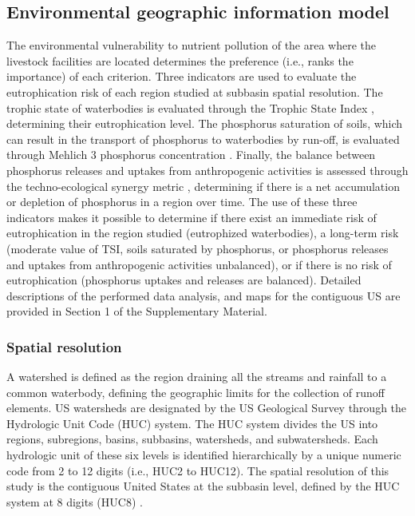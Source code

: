 \begin{refsection}[referencesCh4]
\subsection{Environmental geographic information model}
The environmental vulnerability to nutrient pollution of the area where the livestock facilities are located determines the preference (i.e., ranks the importance) of each criterion. 
Three indicators are used to evaluate the eutrophication risk of each region studied at subbasin spatial resolution. The trophic state of waterbodies is evaluated through the Trophic State Index \citep{carlson_trophic_1977}, determining their eutrophication level. The phosphorus saturation of soils, which can result in the transport of phosphorus to waterbodies by run-off, is evaluated through Mehlich 3 phosphorus concentration \citep{Espinoza2006}. Finally, the balance between phosphorus releases and uptakes from  anthropogenic activities is assessed through the techno-ecological synergy metric \citep{TESmetric}, determining if there is a net accumulation or depletion of phosphorus in a region over time. The use of these three indicators makes it possible to determine if there exist an immediate risk of eutrophication in the region studied (eutrophized waterbodies), a long-term risk (moderate value of TSI, soils saturated by phosphorus, or phosphorus releases and uptakes from  anthropogenic activities unbalanced), or if there is no risk of eutrophication (phosphorus uptakes and releases are balanced). Detailed descriptions of the performed data analysis, and maps for the contiguous US are provided in Section 1 of the Supplementary Material.

\subsubsection{Spatial resolution}
A watershed is defined as the region draining all the streams and rainfall to a common waterbody, defining the geographic limits for the collection of runoff elements. US watersheds are designated by the US Geological Survey through the Hydrologic Unit Code (HUC) system. The HUC system divides the US into regions, subregions, basins, subbasins, watersheds, and subwatersheds. Each hydrologic unit of these six levels is identified hierarchically by a unique numeric code from 2 to 12 digits (i.e., HUC2 to HUC12).
The spatial resolution of this study is the contiguous United States at the subbasin level, defined by the HUC system at 8 digits (HUC8) \citep{HUC8}.


\end{refsection}
